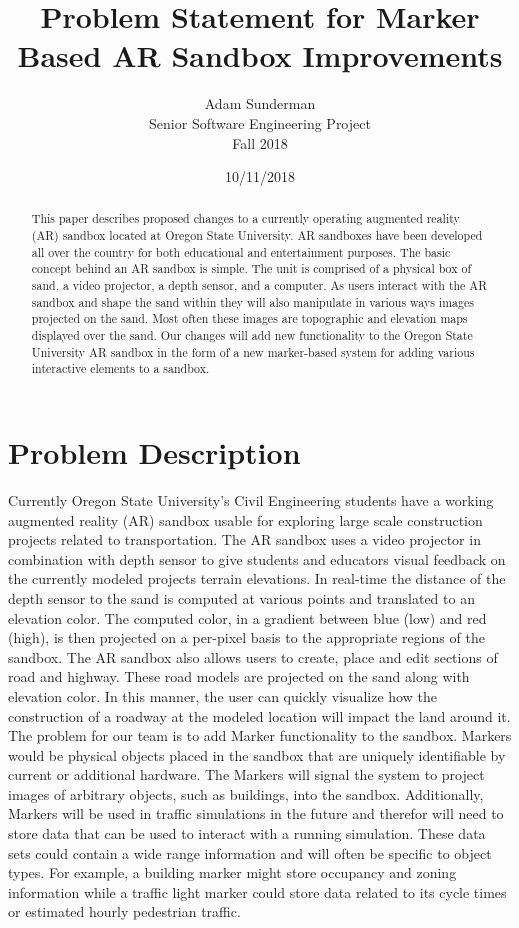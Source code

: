 \documentclass[letterpaper, 10pt, onecolumn, draftclsnofoot]{IEEEtran}
\title{Problem Statement for Marker Based AR Sandbox Improvements}
\author{Adam Sunderman\\Senior Software Engineering Project\\Fall 2018}
\date{10/11/2018}
\begin{document}
\maketitle
\begin{abstract}
This paper describes proposed changes to a currently operating augmented reality (AR) sandbox located at Oregon State University. AR sandboxes have been developed all over the country for both educational and entertainment purposes. The basic concept behind an AR sandbox is simple. The unit is comprised of a physical box of sand, a video projector, a depth sensor, and a computer. As users interact with the AR sandbox and shape the sand within they will also manipulate in various ways images projected on the sand. Most often these images are topographic and elevation maps displayed over the sand. Our changes will add new functionality to the Oregon State University AR sandbox in the form of a new marker-based system for adding various interactive elements to a sandbox.\\
\end{abstract}
\newpage

\section{Problem Description}
Currently Oregon State University’s Civil Engineering students have a working augmented reality (AR) sandbox usable for exploring large scale construction projects related to transportation. The AR sandbox uses a video projector in combination with depth sensor to give students and educators visual feedback on the currently modeled projects terrain elevations. In real-time the distance of the depth sensor to the sand is computed at various points and translated to an elevation color. The computed color, in a gradient between blue (low) and red (high), is then projected on a per-pixel basis to the appropriate regions of the sandbox. The AR sandbox also allows users to create, place and edit sections of road and highway. These road models are projected on the sand along with elevation color. In this manner, the user can quickly visualize how the construction of a roadway at the modeled location will impact the land around it.\\
The problem for our team is to add Marker functionality to the sandbox. Markers would be physical objects placed in the sandbox that are uniquely identifiable by current or additional hardware. The Markers will signal the system to project images of arbitrary objects, such as buildings, into the sandbox. Additionally, Markers will be used in traffic simulations in the future and therefor will need to store data that can be used to interact with a running simulation. These data sets could contain a wide range information and will often be specific to object types. For example, a building marker might store occupancy and zoning information while a traffic light marker could store data related to its cycle times or estimated hourly pedestrian traffic.\\  
\end{document}
